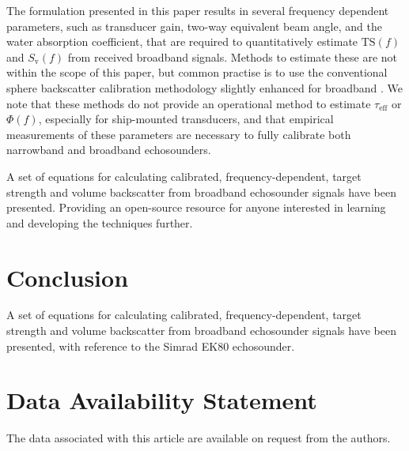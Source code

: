 \documentclass[preprint,12pt,TurnOnLineNumbers]{JASAnew}
\newcommand{\ek}{Simrad EK80}
\newcommand{\freqsym}{f}
\newcommand{\teff}{\tau_{\textrm{eff}}}
\newcommand{\ts}{\textrm{TS}}
\newcommand{\sv}{S_{\textrm{v}}}
\begin{document}
The formulation presented in this paper results in several frequency dependent parameters, such as transducer gain, two-way equivalent beam angle, and the water absorption coefficient, that are required to quantitatively estimate $\ts(\freqsym)$ and $\sv(\freqsym)$ from received broadband signals. Methods to estimate these are not within the scope of this paper, but common practise is to use the conventional sphere backscatter calibration methodology \citep{demerCalibrationAcousticInstruments2015} slightly enhanced for broadband \citep{hobaekCharacterizationTargetSpheres2013,lavery2017}. We note that these methods do not provide an operational method to estimate $\teff$ or $\Phi(f)$, especially for ship-mounted transducers, and that empirical measurements of these parameters are necessary to fully calibrate both narrowband and broadband echosounders.

A set of equations for calculating calibrated, frequency-dependent, target strength and volume backscatter from broadband echosounder signals have been presented. Providing an open-source resource for anyone interested in learning and developing the techniques further.  


\section{Conclusion}

A set of equations for calculating calibrated, frequency-dependent, target strength and volume backscatter from broadband echosounder signals have been presented, with reference to the \ek{} echosounder.

\section{Data Availability Statement}

The data associated with this article are available on request from the authors.


\end{document}
